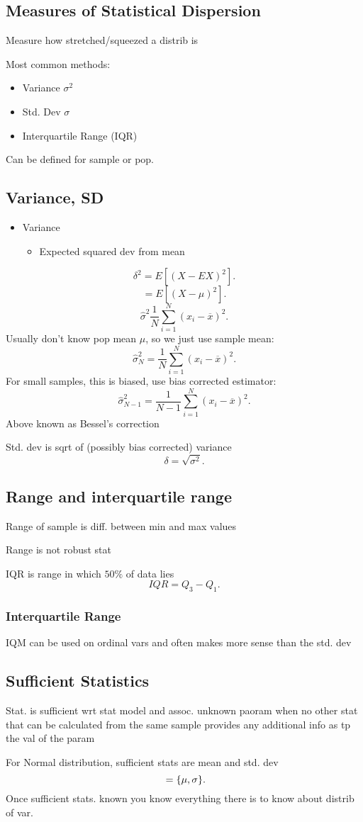 \documentclass[a4paper]{article}
\begin{document}
\subsection{Measures of Statistical Dispersion}
Measure how stretched/squeezed a distrib is
\par Most common methods:
\begin{itemize}
	\item Variance $\sigma^2$
	\item Std. Dev $\sigma$
	\item Interquartile Range (IQR)
\end{itemize}
Can be defined for sample or pop.
\subsection{Variance, SD}
\begin{itemize}
	\item Variance
	\begin{itemize}
		\item Expected squared dev from mean
	\end{itemize}
\end{itemize}
\[
	\delta^2=E[(X-EX)^2]
.\]
\[
	=E[(X-\mu)^2]
.\]
\[
	\hat{\sigma}^2 \frac{1}{N}\sum_{i=1}^{N} (x_i-\overline{x})^2
.\]
Usually don't know pop mean $\mu$, so we just use sample mean:
\[
	\hat{\sigma}_N^2=\frac{1}{N}\sum_{i=1}^{N} (x_i-\overline{x})^2
.\]
For small samples, this is biased, use bias corrected estimator:
\[
	\hat{\sigma}_{N-1}^2=\frac{1}{N-1}\sum_{i=1}^{N} (x_i-\overline{x})^2
.\]
Above known as Bessel's correction
\par Std. dev is sqrt of (possibly bias corrected) variance
\[
\delta=\sqrt{\sigma^2}
.\]
\subsection{Range and interquartile range}
Range of sample is diff. between min and max values
\par Range is not robust stat
\par IQR is range in which $50\%$ of data lies
\[
IQR=Q_3 - Q_1
.\]
\subsubsection{Interquartile Range}
IQM can be used on ordinal vars and often makes more sense than the std. dev
\subsection{Sufficient Statistics}
Stat. is sufficient wrt stat model and assoc. unknown paoram when no other stat
that can be calculated from the same sample provides any additional info as tp
the val of the param
\par For Normal distribution, sufficient stats are mean and std. dev
\[
\null =\{\mu, \sigma\}
.\]
Once sufficient stats. known you know everything there is to know about distrib
of var.
\end{document}
